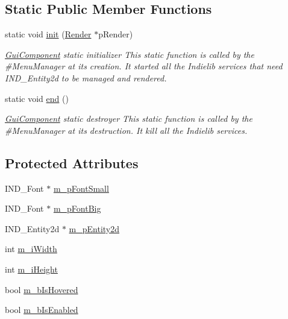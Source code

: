 \subsection*{Static Public Member Functions}
\begin{DoxyCompactItemize}
\item 
static void \hyperlink{class_symp_1_1_gui_component_a05838e01bbf1e31f292ed4b92a520f20}{init} (\hyperlink{class_symp_1_1_render}{Render} $\ast$p\-Render)
\begin{DoxyCompactList}\small\item\em \hyperlink{class_symp_1_1_gui_component}{Gui\-Component} static initializer This static function is called by the \#\-Menu\-Manager at its creation. It started all the Indielib services that need I\-N\-D\-\_\-\-Entity2d to be managed and rendered. \end{DoxyCompactList}\item 
static void \hyperlink{class_symp_1_1_gui_component_a011075cc3a09e9a4494557fcb56dff18}{end} ()
\begin{DoxyCompactList}\small\item\em \hyperlink{class_symp_1_1_gui_component}{Gui\-Component} static destroyer This static function is called by the \#\-Menu\-Manager at its destruction. It kill all the Indielib services. \end{DoxyCompactList}\end{DoxyCompactItemize}
\subsection*{Protected Attributes}
\begin{DoxyCompactItemize}
\item 
I\-N\-D\-\_\-\-Font $\ast$ \hyperlink{class_symp_1_1_gui_component_a9704a149c8207503b3a7824b096b7b9f}{m\-\_\-p\-Font\-Small}
\item 
I\-N\-D\-\_\-\-Font $\ast$ \hyperlink{class_symp_1_1_gui_component_a784e1d58bb695ca95f12c1611f144488}{m\-\_\-p\-Font\-Big}
\item 
I\-N\-D\-\_\-\-Entity2d $\ast$ \hyperlink{class_symp_1_1_gui_component_ae2548627f8f866222e13347cc4284b24}{m\-\_\-p\-Entity2d}
\item 
int \hyperlink{class_symp_1_1_gui_component_ad4c3e34b824e1f9d6a030ca54fc1a7cf}{m\-\_\-i\-Width}
\item 
int \hyperlink{class_symp_1_1_gui_component_aa84bb60b7aa1adb1522c63acff2909c2}{m\-\_\-i\-Height}
\item 
bool \hyperlink{class_symp_1_1_gui_component_abb0e57a2b738621ed7e4aa89bf65e44e}{m\-\_\-b\-Is\-Hovered}
\item 
bool \hyperlink{class_symp_1_1_gui_component_af7a55b2a7e2f3e11c30a51f32571564f}{m\-\_\-b\-Is\-Enabled}
\end{DoxyCompactItemize}
